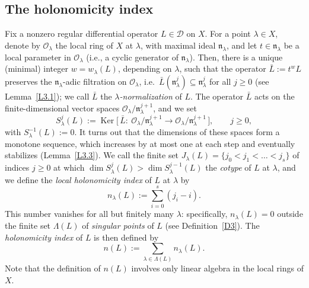 \documentclass[11pt,reqno]{amsart}
\theoremstyle{plain}
\theoremstyle{definition}
\theoremstyle{remark}
\numberwithin{equation}{section}
\newcommand{\cD}{\mathcal{D}}
\newcommand{\cO}{\mathcal{O}}
\newcommand{\nl}{\mathfrak{n}_\lambda}
\DeclareMathOperator{\Ker}{Ker}
\begin{document}
\subsection*{The holonomicity index}
Fix a nonzero regular differential operator $L \in \cD$ on $X$. For a point $\lambda \in X$, 
denote by $\cO_\lambda$  the local ring of $X$ at $\lambda$, with maximal ideal $\nl$, and let $t \in \nl$ be a local parameter in $\cO_\lambda$ (i.e., a cyclic generator of $\nl$). Then, there is a
unique (minimal) integer $w = w_{\lambda}(L)$, depending on $\lambda$, such that the operator $\bar L := t^{w} L$ preserves the $\nl$-adic filtration
on $\cO_\lambda$, i.e.\ $\bar L(\nl^j) \subseteq \nl^j$ for all $j \ge 0$
(see Lemma~\ref{L3.1}); we call $\bar L$ the \emph{$\lambda$-normalization} of $L$. The operator
$\bar L$ acts on the finite-dimensional vector spaces $\cO_\lambda/\nl^{j+1}$, and we set
\begin{equation}
\label{E13}
  S^j_\lambda(L) := \Ker\bigl[\, \bar L : \ \cO_\lambda/\nl^{j+1} \to \cO_\lambda/\nl^{j+1} \,\bigr] ,
  \qquad j \ge 0 ,
\end{equation}
with  $S^{-1}_\lambda(L) := 0$. It turns out that the dimensions of these spaces form a monotone sequence, which increases by at most one at each step and eventually stabilizes
(Lemma~\ref{L3.3}). We call the finite set
$J_\lambda(L) = \{ j_0 < j_1 < \ldots < j_{s} \}$ of indices $j \ge 0$ at which
$\dim S^j_\lambda(L) > \dim S^{j-1}_\lambda(L)$ the \emph{cotype} of $L$ at $\lambda$, and we
define the \emph{local holonomicity index} of $L$ at $\lambda$ by
\begin{equation}
\label{E14}
  n_\lambda(L) := \sum_{i=0}^{s} (j_i - i) .
\end{equation}
This number vanishes for all but finitely many $\lambda$: specifically, $n_\lambda(L) = 0$ outside
the finite set $\Lambda(L)$ of \emph{singular points} of $L$ (see Definition~\ref{D3}). The
\emph{holonomicity index} of $L$ is then defined by
\begin{equation}
\label{E15}
  n(L) := \sum_{\lambda \in \Lambda(L)} n_\lambda(L) .
\end{equation}
Note that the definition of $n(L)$ involves only linear algebra in the local rings of $X$.
\end{document}
